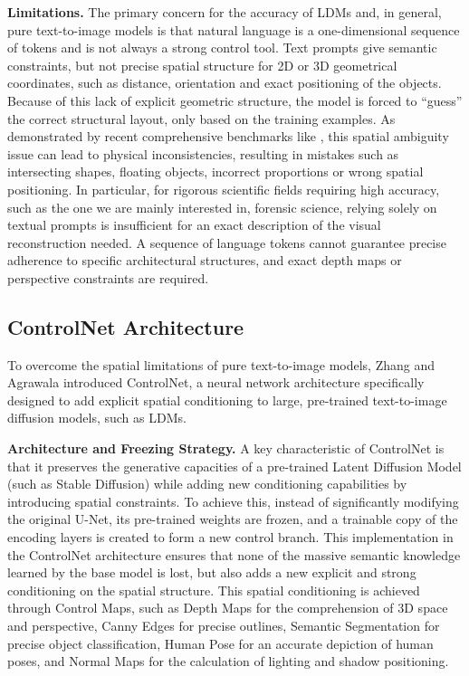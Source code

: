 \documentclass[10pt,twocolumn,letterpaper]{article}
\begin{document}
\textbf{Limitations.} The primary concern for the accuracy of LDMs and, in general, pure text-to-image models is that natural language is a one-dimensional sequence of tokens and is not always a strong control tool. Text prompts give semantic constraints, but not precise spatial structure for 2D or 3D geometrical coordinates, such as distance, orientation and exact positioning of the objects. Because of this lack of explicit geometric structure, the model is forced to ``guess'' the correct structural layout, only based on the training examples. As demonstrated by recent comprehensive benchmarks like \cite{NEURIPS2023_f8ad010c}, this spatial ambiguity issue can lead to physical inconsistencies, resulting in mistakes such as intersecting shapes, floating objects, incorrect proportions or wrong spatial positioning. In particular, for rigorous scientific fields requiring high accuracy, such as the one we are mainly interested in, forensic science, relying solely on textual prompts is insufficient for an exact description of the visual reconstruction needed. A sequence of language tokens cannot guarantee precise adherence to specific architectural structures, and exact depth maps or perspective constraints are required.

\subsection{ControlNet Architecture}

To overcome the spatial limitations of pure text-to-image models, Zhang and Agrawala \cite{Zhang_2023_ICCV} introduced ControlNet, a neural network architecture specifically designed to add explicit spatial conditioning to large, pre-trained text-to-image diffusion models, such as LDMs.

\textbf{Architecture and Freezing Strategy.} A key characteristic of ControlNet is that it preserves the generative capacities of a pre-trained Latent Diffusion Model (such as Stable Diffusion) while adding new conditioning capabilities by introducing spatial constraints. To achieve this, instead of significantly modifying the original U-Net, its pre-trained weights are frozen, and a trainable copy of the encoding layers is created to form a new control branch. This implementation in the ControlNet architecture ensures that none of the massive semantic knowledge learned by the base model is lost, but also adds a new explicit and strong conditioning on the spatial structure.
This spatial conditioning is achieved through Control Maps, such as Depth Maps for the comprehension of 3D space and perspective, Canny Edges for precise outlines, Semantic Segmentation for precise object classification, Human Pose for an accurate depiction of human poses, and Normal Maps for the calculation of lighting and shadow positioning.
\end{document}
